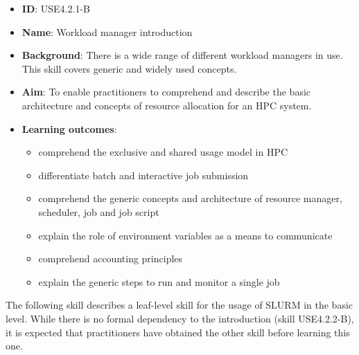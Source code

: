 \documentclass[jocse]{jocseart}
\begin{document}
\begin{itemize}
  \item \textbf{ID}: USE4.2.1-B
  \item \textbf{Name}: Workload manager introduction
  \item \textbf{Background}: There is a wide range of different workload managers in use. This skill covers generic and widely used concepts.
  \item \textbf{Aim}: To enable practitioners to comprehend and describe the basic architecture and concepts of resource allocation for an HPC system.
  \item \textbf{Learning outcomes}:

  \begin{itemize}
  \item comprehend the exclusive and shared usage model in HPC
  \item differentiate batch and interactive job submission
  \item comprehend the generic concepts and architecture of resource manager, scheduler, job and job script
  \item explain the role of environment variables as a means to communicate
  \item comprehend accounting principles
  \item explain the generic steps to run and monitor a single job
  \end{itemize}
\end{itemize}


The following skill describes a leaf-level skill for the usage of SLURM in the basic level.
While there is no formal dependency to the introduction (skill USE4.2.2-B), it is expected that practitioners have obtained the other skill before learning this one.
\end{document}
